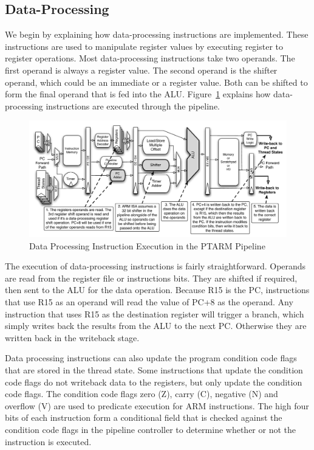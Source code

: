 \subsection{Data-Processing}
We begin by explaining how data-processing instructions are implemented.
These instructions are used to manipulate register values by executing register to register operations. 
Most data-processing instructions take two operands.
The first operand is always a register value.
The second operand is the shifter operand, which could be an immediate or a register value.
Both can be shifted to form the final operand that is fed into the ALU.
Figure~\ref{fig:data_processing_pipeline_implementation} explains how data-processing instructions are executed through the pipeline.

\begin{figure}[h]
  
  \begin{center}
    \includegraphics[scale=.54]{figs/data_processing_pipeline_implementation}
  \end{center}
  \vspace{-3mm}
  \caption{Data Processing Instruction Execution in the PTARM Pipeline}
  \label{fig:data_processing_pipeline_implementation}
\end{figure}

The execution of data-processing instructions is fairly straightforward.
Operands are read from the register file or instructions bits.
They are shifted if required, then sent to the ALU for the data operation.  
Because R15 is the PC, instructions that use R15 as an operand will read the value of PC+8 as the operand. 
Any instruction that uses R15 as the destination register will trigger a branch, which simply writes back the results from the ALU to the next PC.
Otherwise they are written back in the writeback stage. 

Data processing instructions can also update the program condition code flags that are stored in the thread state. 
Some instructions that update the condition code flags do not writeback data to the registers, but only update the condition code flags.
The condition code flags zero (Z), carry (C), negative (N) and overflow (V) are used to predicate execution for ARM instructions.
The high four bits of each instruction form a conditional field that is checked against the condition code flags in the pipeline controller to determine whether or not the instruction is executed. 

